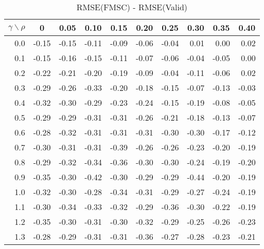 \documentclass[12pt]{article}
\begin{document}
\begin{table}[!tbp]
\caption{RMSE(FMSC) - RMSE(Valid)}
 \begin{center}
 \begin{tabular}{r|rrrrrrrrr}\hline\hline
\multicolumn{1}{c|}{$\gamma\backslash\rho$}&\multicolumn{1}{c}{0}&\multicolumn{1}{c}{0.05}&\multicolumn{1}{c}{0.10}&\multicolumn{1}{c}{0.15}&\multicolumn{1}{c}{0.20}&\multicolumn{1}{c}{0.25}&\multicolumn{1}{c}{0.30}&\multicolumn{1}{c}{0.35}&\multicolumn{1}{c}{0.40}\tabularnewline
\hline

0.0&-0.15&-0.15&-0.11&-0.09&-0.06&-0.04& 0.01& 0.00& 0.02\tabularnewline
0.1&-0.15&-0.16&-0.15&-0.11&-0.07&-0.06&-0.04&-0.05& 0.00\tabularnewline
0.2&-0.22&-0.21&-0.20&-0.19&-0.09&-0.04&-0.11&-0.06& 0.02\tabularnewline
0.3&-0.29&-0.26&-0.33&-0.20&-0.18&-0.15&-0.07&-0.13&-0.03\tabularnewline
0.4&-0.32&-0.30&-0.29&-0.23&-0.24&-0.15&-0.19&-0.08&-0.05\tabularnewline
0.5&-0.29&-0.29&-0.31&-0.31&-0.26&-0.21&-0.18&-0.13&-0.07\tabularnewline
0.6&-0.28&-0.32&-0.31&-0.31&-0.31&-0.30&-0.30&-0.17&-0.12\tabularnewline
0.7&-0.30&-0.31&-0.31&-0.39&-0.26&-0.26&-0.23&-0.20&-0.19\tabularnewline
0.8&-0.29&-0.32&-0.34&-0.36&-0.30&-0.30&-0.24&-0.19&-0.20\tabularnewline
0.9&-0.35&-0.30&-0.42&-0.30&-0.29&-0.29&-0.44&-0.20&-0.19\tabularnewline
1.0&-0.32&-0.30&-0.28&-0.34&-0.31&-0.29&-0.27&-0.24&-0.19\tabularnewline
1.1&-0.30&-0.34&-0.33&-0.32&-0.29&-0.36&-0.30&-0.22&-0.19\tabularnewline
1.2&-0.35&-0.30&-0.31&-0.30&-0.32&-0.29&-0.25&-0.26&-0.23\tabularnewline
1.3&-0.28&-0.29&-0.31&-0.31&-0.36&-0.27&-0.28&-0.23&-0.21\tabularnewline
\hline
\end{tabular}

\end{center}

\end{table}

%
\end{document}
